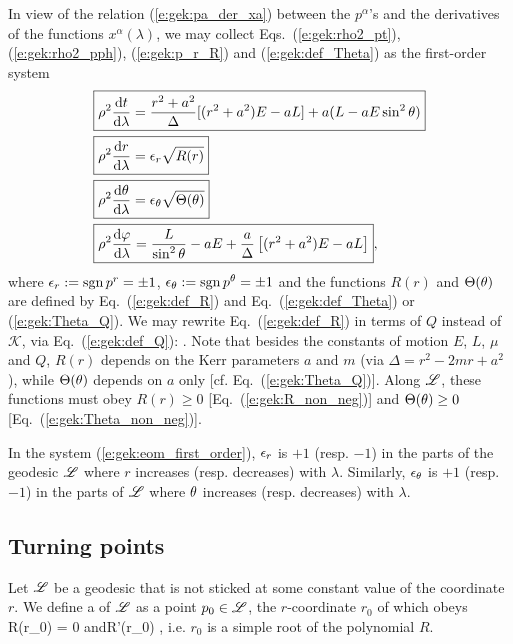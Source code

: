 In view of the relation (\ref{e:gek:pa_der_xa}) between the $p^\alpha$'s
and the derivatives of the functions $x^\alpha(\lambda)$, we may
collect Eqs.~(\ref{e:gek:rho2_pt}), (\ref{e:gek:rho2_pph}), (\ref{e:gek:p_r_R})
and (\ref{e:gek:def_Theta}) as the first-order system
\begin{subequations}
\label{e:gek:eom_first_order}
\begin{align}
& \fbox{$\displaystyle  \rho^2 \frac{\mathrm{d} t}{\mathrm{d} \lambda} = \frac{r^2 + a^2}{\Delta} [(r^2 + a^2) E - a L] + a ( L - a E \sin^2\theta ) $} \label{e:gek:dtdl} \\
& \fbox{$\displaystyle  \rho^2 \frac{\mathrm{d} r}{\mathrm{d} \lambda} = \epsilon_r \sqrt{ R(r) } $} \label{e:gek:drdl}\\
& \fbox{$\displaystyle  \rho^2 \frac{\mathrm{d} \theta}{\mathrm{d} \lambda} = \epsilon_\theta \sqrt{\Theta(\theta)} $} \label{e:gek:dthdl}\\
& \fbox{$\displaystyle  \rho^2 \frac{\mathrm{d} \varphi}{\mathrm{d} \lambda}  = \frac{L}{\sin^2\theta} - a E
    + \frac{a}{\Delta}\left[(r^2 + a^2) E - a L\right] $} , \label{e:gek:dphdl}
\end{align}
\end{subequations}
where $\epsilon_r := \operatorname{sgn} p^r = \pm 1$,  $\epsilon_\theta := \operatorname{sgn} p^\theta = \pm 1$
and the functions $R(r)$ and $\Theta(\theta)$ are defined by Eq.~(\ref{e:gek:def_R})
and Eq.~(\ref{e:gek:def_Theta}) or (\ref{e:gek:Theta_Q}).
We may rewrite Eq.~(\ref{e:gek:def_R}) in terms of $Q$
instead of $\mathscr{K}$, via Eq.~(\ref{e:gek:def_Q}):
\be \label{e:gek:def_R_Q}
   .
\ee
Note that besides the constants of motion $E$, $L$, $\mu$ and $Q$, $R(r)$ depends on the Kerr parameters $a$ and $m$
(via $\Delta = r^2 - 2 m r + a^2$), while $\Theta(\theta)$
depends on $a$ only [cf. Eq.~(\ref{e:gek:Theta_Q})].
Along $\mathscr{L}$, these functions must obey
$R(r) \geq 0$ [Eq.~(\ref{e:gek:R_non_neg})] and $\Theta(\theta) \geq 0$
[Eq.~(\ref{e:gek:Theta_non_neg})].

In the system (\ref{e:gek:eom_first_order}), $\epsilon_r$
is $+1$ (resp. $-1$) in the parts of the geodesic $\mathscr{L}$ where $r$ increases
(resp. decreases) with $\lambda$. Similarly, $\epsilon_\theta$
is $+1$ (resp. $-1$) in the parts of $\mathscr{L}$ where $\theta$ increases
(resp. decreases) with $\lambda$.

\subsection{Turning points} \label{s:gek:turning_points}

Let $\mathscr{L}$ be a geodesic that is not sticked at some constant value of the
coordinate $r$.
We define a  of $\mathscr{L}$ as a point $p_0\in\mathscr{L}$, the $r$-coordinate $r_0$ of which obeys
\be \label{e:gek:def_r_turning}
    R(r_0) = 0 \quad\mbox{and}\quad R'(r_0)  ,
\ee
i.e. $r_0$ is a simple root of the polynomial $R$.

